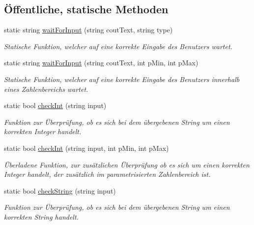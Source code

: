 \subsection*{Öffentliche, statische Methoden}
\begin{DoxyCompactItemize}
\item 
static string \hyperlink{classContactManager_1_1Controller_a7de8c795f0a2e8d6eba2cf1710504ad2}{wait\+For\+Input} (string cout\+Text, string type)
\begin{DoxyCompactList}\small\item\em Statische Funktion, welcher auf eine korrekte Eingabe des Benutzers wartet.\end{DoxyCompactList}\item 
static string \hyperlink{classContactManager_1_1Controller_a6aa420a52715951c7fdfe93c4122808a}{wait\+For\+Input} (string cout\+Text, int p\+Min, int p\+Max)
\begin{DoxyCompactList}\small\item\em Statische Funktion, welcher auf eine korrekte Eingabe des Benutzers innerhalb eines Zahlenbereichs wartet.\end{DoxyCompactList}\item 
static bool \hyperlink{classContactManager_1_1Controller_a9228c2d2d075707af32f9cceded67566}{check\+Int} (string input)
\begin{DoxyCompactList}\small\item\em Funktion zur Überprüfung, ob es sich bei dem übergebenen String um einen korrekten Integer handelt.\end{DoxyCompactList}\item 
static bool \hyperlink{classContactManager_1_1Controller_a4d7439dbaddaefd7a8ef91d50ce226e9}{check\+Int} (string input, int p\+Min, int p\+Max)
\begin{DoxyCompactList}\small\item\em Überladene Funktion, zur zusätzlichen Überprüfung ob es sich um einen korrekten Integer handelt, der zusätzlich im parametrisierten Zahlenbereich ist.\end{DoxyCompactList}\item 
static bool \hyperlink{classContactManager_1_1Controller_a409958c7f170c9e269e258bb5a4483e2}{check\+String} (string input)
\begin{DoxyCompactList}\small\item\em Funktion zur Überprüfung, ob es sich bei dem übergebenen String um einen korrekten String handelt.\end{DoxyCompactList}\item 

\end{DoxyCompactItemize}
